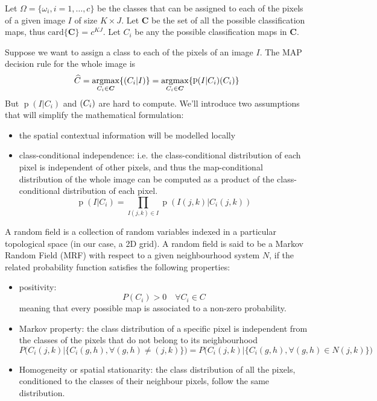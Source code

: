 \documentclass[oneside,onecolumn]{report}
\DeclareMathOperator*{\argmax}{argmax}
\DeclareMathOperator*{\pdf}{p}
\let\P\relax
\DeclareMathOperator*{\P}{P}
\begin{document}
Let $\Omega = \{\omega_i, i = 1, \dots, c\}$ be the classes that can be assigned to each of the pixels of a given image $I$ of size $K \times J$.
Let $\bm C$ be the set of all the possible classification maps, thus $\text{card}\{\bm C\} = c^{K J}$.
Let $C_i$ be any the possible classification maps in $\bm C$.

Suppose we want to assign a class to each of the pixels of an image $I$.
The MAP decision rule for the whole image is
$$ \widehat C = \argmax_{C_i \in \bm C}\{\P(C_i | I)\} = \argmax_{C_i \in \bm C}\{\pdf(I | C_i) \P(C_i) \} $$
But $\pdf(I | C_i)$ and $\P(C_i)$ are hard to compute.
We'll introduce two assumptions that will simplify the mathematical formulation:
\begin{itemize}
    \item the spatial contextual information will be modelled locally
    \item class-conditional independence: i.e. the class-conditional distribution of each pixel is independent of other pixels, and thus the map-conditional distribution of the whole image can be computed as a product of the class-conditional distribution of each pixel.
    $$ \pdf(I | C_i) = \prod_{I(j, k) \in I} \pdf(I(j, k) | C_i(j, k)) $$
\end{itemize}

A random field is a collection of random variables indexed in a particular topological space (in our case, a 2D grid).
A random field is said to be a Markov Random Field (MRF) with respect to a given neighbourhood system $N$, if the related probability function satisfies the following properties:
\begin{itemize}
    \item positivity:
    $$ P(C_i) > 0 \quad \forall C_i \in C $$
    meaning that every possible map is associated to a non-zero probability.

    \item Markov property: the class distribution of a specific pixel is independent from the classes of the pixels that do not belong to its neighbourhood
    $$ P\Big(C_i(j, k) \Big| \big\{ C_i(g, h), \forall (g, h) \neq (j, k) \big\}\Big) =
    P\Big(C_i(j, k) \Big| \big\{ C_i(g, h), \forall (g, h) \in N(j, k) \big\}\Big) $$

    \item Homogeneity or spatial stationarity: the class distribution of all the pixels, conditioned to the classes of their neighbour pixels, follow the same distribution.
\end{itemize}
\end{document}
